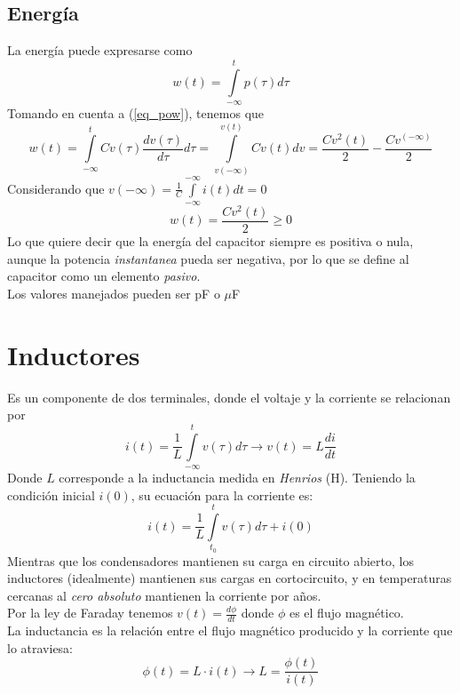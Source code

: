 \documentclass[12pt,spanish,lettersize]{article}
\begin{document}
\subsection{Energ\'ia}
La energ\'ia puede expresarse como
\begin{equation}
w(t) = \int\limits_{-\infty}^{t}p(\tau)d\tau
\end{equation}
Tomando en cuenta a (\ref{eq_pow}), tenemos que
\begin{equation}\label{eq_pow2}
w(t) = \int\limits_{-\infty}^{t}Cv(\tau)\frac{dv(\tau)}{d\tau}d\tau = \int\limits_{v(-\infty)}^{v(t)}Cv(t)dv = \frac{Cv^2(t)}{2}-\frac{Cv^(-\infty)}{2}
\end{equation}
Considerando que $v(-\infty)=\frac{1}{C}\int\limits_{-\infty}^{-\infty}i(t)dt = 0$
\begin{equation}\label{eq_powf}
w(t) = \frac{Cv^2(t)}{2} \geq 0
\end{equation}
Lo que quiere decir que la energ\'ia del capacitor siempre es positiva o nula, aunque la potencia \emph{instantanea} pueda ser negativa, por lo que se define al capacitor como un elemento \emph{pasivo}.\\
Los valores manejados pueden ser pF o $\mu$F
\section{Inductores}
Es un componente de dos terminales, donde el voltaje y la corriente se relacionan por
\begin{equation}\label{eq_induct0}
i(t) = \frac{1}{L}\int\limits_{-\infty}^{t}v(\tau)d\tau \rightarrow v(t)= L\frac{di}{dt}
\end{equation}
Donde $L$ corresponde a la inductancia medida en \emph{Henrios} (H). Teniendo la condici\'on inicial $i(0)$, su ecuaci\'on para la corriente es:
\begin{equation}\label{eq_Induct1}
i(t) = \frac{1}{L}\int\limits_{t_{0}}^{t}v(\tau)d\tau + i(0)
\end{equation}
Mientras que los condensadores mantienen su carga en circuito abierto, los inductores (idealmente) mantienen sus cargas en cortocircuito, y en temperaturas cercanas al \emph{cero absoluto} mantienen la corriente por a\~nos.\\
Por la ley de Faraday tenemos $v(t) = \frac{d\phi}{dt}$ donde $\phi$ es el flujo magn\'etico.\\
La inductancia es la relaci\'on entre el flujo magn\'etico producido y la corriente que lo atraviesa:
\begin{equation}\label{eq_inductancia}
\phi(t) = L\cdot i(t) \rightarrow L=\frac{\phi(t)}{i(t)}
\end{equation}
\end{document}
